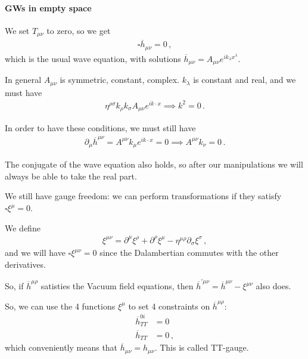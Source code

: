 \documentclass[main.tex]{subfiles}
\begin{document}
\paragraph{GWs in empty space}

We set \(T_{\mu  \nu }\) to zero, so we get 
%
\begin{align}
\square \overline{h}_{\mu \nu } = 0
\,,
\end{align}
%
which is the usual wave equation, with solutions \(\overline{h}_{\mu \nu } = A_{\mu \nu } e^{i k_{\lambda }x^{\lambda }}\). 

In general \(A_{\mu \nu } \) is symmetric, constant, complex. \(k_{\lambda }\) is constant and real, and we must have 
%
\begin{align}
\eta^{\rho \sigma } k_{\rho } k_{\sigma } A_{\mu \nu } e^{i k \cdot x } \implies k^2=0
\,.
\end{align}

In order to have these conditions, we must still have 
%
\begin{align}
\partial_{\mu } \overline{h}^{\mu \nu } 
= A^{\mu \nu } k_{\mu } e^{i k \cdot x } = 0 
\implies A^{\mu \nu }k_{\nu } = 0
\,.
\end{align}

The conjugate of the wave equation also holds, so after our manipulations we will always be able to take the real part. 

We still have gauge freedom: we can perform transformations if they satisfy \(\square \xi^{\mu }=0\).

We define 
%
\begin{align}
\xi^{\mu \nu } = \partial^{ \mu } \xi^{\rho } + \partial^{\rho } \xi^{\mu } - \eta^{\mu \rho } \partial_{\sigma } \xi^{\sigma }
\,,
\end{align}
%
and we will have \(\square \xi^{\mu \nu } =0 \)  since the Dalambertian commutes with the other derivatives.

So, if \(\overline{h}^{\mu \rho }\) satisties the Vacuum field equations, then \(\overline{h}^{\prime \mu \nu } = \overline{h}^{\mu \nu } - \xi^{\mu \nu }\) also does. 

So, we can use the 4 functions \(\xi^{\mu }\) to set 4 constraints on \(\overline{h}^{\mu \rho }\): 
%
\begin{align}
\overline{h}^{0i}_{TT} &= 0  \\
 \overline{h}_{TT} &= 0
\,,
\end{align}
%
which conveniently means that \(\overline{h}_{\mu \nu } = h_{\mu \nu }\). This is called TT-gauge. 
\end{document}
